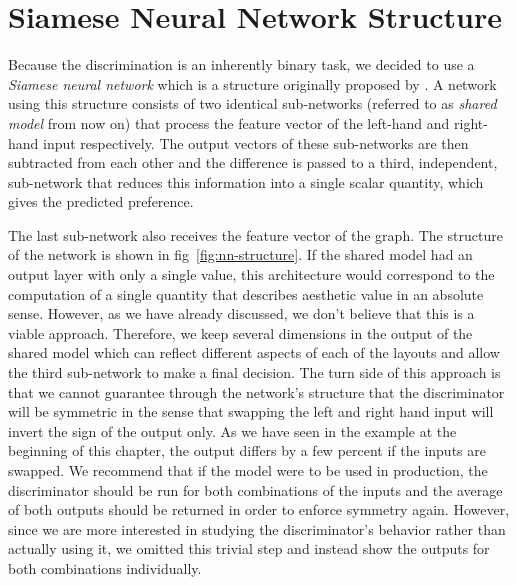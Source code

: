 \documentclass{graphstudy}
\begin{document}
\begin{Figure}
  \begin{center}
  \end{center}
  \caption[Comparing Layouts in the Web UI]{%
    Screenshots of the web \acs{ui} for querying the discriminator about its aesthetic judgment.  The filled and
    outlined triangle indicates the result in forward and reverse order respectively.  The user can also click on either
    layout in order to view detailed information about it.  Clicking on the \enquote{feature vectors} link will show a
    table which details the deviation of each feature of the two layouts from the average over all layouts in the
    database as well as the difference between the two feature vectors.
  }
  \label{fig:compare-web-ui}
\end{Figure}

\section{Siamese Neural Network Structure}

Because the discrimination is an inherently binary task, we decided to use a \emph{Siamese neural network} which is a
structure originally proposed by \textcite{Bromley1994}.  A network using this structure consists of two identical
sub-networks (referred to as \emph{shared model} from now on) that process the feature vector of the left-hand and
right-hand input respectively.  The output vectors of these sub-networks are then subtracted from each other and the
difference is passed to a third, independent, sub-network that reduces this information into a single scalar quantity,
which gives the predicted preference.

The last sub-network also receives the feature vector of the graph.  The structure of the network is shown in
\acl{fig}~\ref{fig:nn-structure}.  If the shared model had an output layer with only a single value, this architecture
would correspond to the computation of a single quantity that describes aesthetic value in an absolute sense.  However,
as we have already discussed, we don't believe that this is a viable approach.  Therefore, we keep several dimensions in
the output of the shared model which can reflect different aspects of each of the layouts and allow the third
sub-network to make a final decision.  The turn side of this approach is that we cannot guarantee through the network's
structure that the discriminator will be symmetric in the sense that swapping the left and right hand input will invert
the sign of the output only.  As we have seen in the example at the beginning of this chapter, the output differs by a
few percent if the inputs are swapped.  We recommend that if the model were to be used in production, the discriminator
should be run for both combinations of the inputs and the average of both outputs should be returned in order to enforce
symmetry again.  However, since we are more interested in studying the discriminator's behavior rather than actually
using it, we omitted this trivial step and instead show the outputs for both combinations individually.
\end{document}
